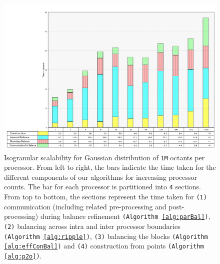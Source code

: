 \begin{figure}
  \begin{center}
    \includegraphics[width=\textwidth]{images/isoGran}
  \end{center}
  \caption{Isogranular scalability for Gaussian distribution of
  {\tt1M} octants per processor. From left to right, the bars indicate
  the time taken for the different components of our algorithms for
  increasing processor counts. The bar for each processor is
  partitioned into {\tt4} sections. From top to bottom, the sections
  represent the time taken for {\tt(1)} communication (including
  related pre-processing and post-processing) during balance
  refinement {\tt(Algorithm \ref{alg:parBal})}, {\tt(2)} balancing
  across intra and inter processor boundaries {\tt(Algorithm
  \ref{alg:ripple})}, {\tt(3)} balancing the blocks {\tt(Algorithm
  \ref{alg:effConBal})} and {\tt(4)} construction from points
  {\tt(Algorithm \ref{alg:p2o})}.}
  \label{fig:isoG}
\end{figure}

